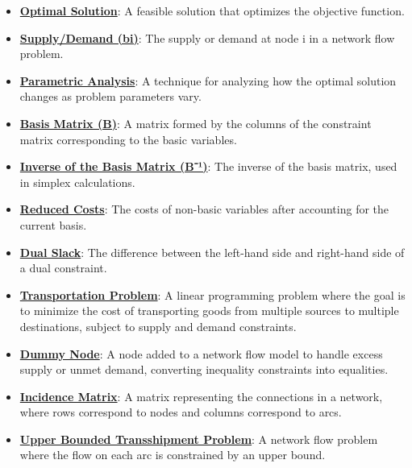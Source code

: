 \documentclass{article}%
\begin{document}
\begin{itemize}[leftmargin=*]
\item \href{https://www.math.purdue.edu/~yipn/421/2024-11-07-NetSimplex.pdf#page=2}{\textbf{Optimal Solution}}: A feasible solution that optimizes the objective function. %
\item \href{https://www.math.purdue.edu/~yipn/421/2024-11-07-NetSimplex.pdf#page=2}{\textbf{Supply/Demand (bi)}}: The supply or demand at node i in a network flow problem. %
\item \href{https://www.math.purdue.edu/~yipn/421/2024-11-07-NetSimplex.pdf#page=4}{\textbf{Parametric Analysis}}: A technique for analyzing how the optimal solution changes as problem parameters vary. %
\item \href{https://www.math.purdue.edu/~yipn/421/2024-11-07-NetSimplex.pdf#page=7}{\textbf{Basis Matrix (B)}}: A matrix formed by the columns of the constraint matrix corresponding to the basic variables. %
\item \href{https://www.math.purdue.edu/~yipn/421/2024-11-07-NetSimplex.pdf#page=7}{\textbf{Inverse of the Basis Matrix (B⁻¹)}}: The inverse of the basis matrix, used in simplex calculations. %
\item \href{https://www.math.purdue.edu/~yipn/421/2024-11-07-NetSimplex.pdf#page=7}{\textbf{Reduced Costs}}: The costs of non-basic variables after accounting for the current basis. %
\item \href{https://www.math.purdue.edu/~yipn/421/2024-11-07-NetSimplex.pdf#page=35}{\textbf{Dual Slack}}: The difference between the left-hand side and right-hand side of a dual constraint. %
\item \href{https://www.math.purdue.edu/~yipn/421/2024-11-14-NetAppls.pdf#page=1}{\textbf{Transportation Problem}}: A linear programming problem where the goal is to minimize the cost of transporting goods from multiple sources to multiple destinations, subject to supply and demand constraints.%
\item \href{https://www.math.purdue.edu/~yipn/421/2024-11-14-NetAppls.pdf#page=3}{\textbf{Dummy Node}}: A node added to a network flow model to handle excess supply or unmet demand, converting inequality constraints into equalities.%
\item \href{https://www.math.purdue.edu/~yipn/421/2024-11-14-NetAppls.pdf#page=7}{\textbf{Incidence Matrix}}: A matrix representing the connections in a network, where rows correspond to nodes and columns correspond to arcs.%
\item \href{https://www.math.purdue.edu/~yipn/421/2024-11-14-NetAppls.pdf#page=9}{\textbf{Upper Bounded Transshipment Problem}}: A network flow problem where the flow on each arc is constrained by an upper bound.%

\end{itemize}
\end{document}
